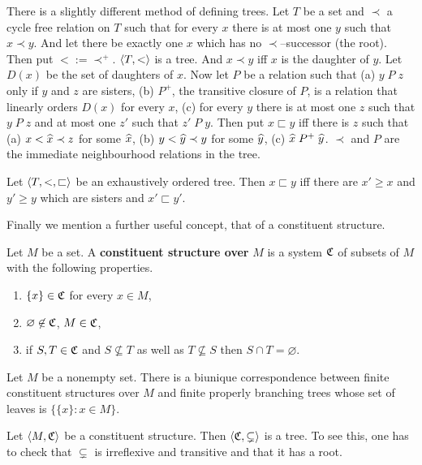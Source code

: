 There is a slightly different method of defining trees.
Let $T$ be a set and $\prec$ a cycle free relation on $T$
such that for every $x$ there is at most one $y $ such that
$x \prec y$. And let there be exactly one $x$ which has no
$\prec$--successor (the root). Then put $< := \prec^+$.
$\langle T, <\rangle$ is a tree. And $x \prec y$ iff
$x$ is the daughter of $y$. Let $D(x)$ be the set of daughters
of $x$. Now let $P$ be a relation such that (a) $y\; P\; z$ only 
if $y$ and $z$ are sisters, (b) $P^+$, the transitive closure 
of $P$, is a relation that linearly orders $D(x)$ for every $x$, 
(c) for every $y$ there is at most one $z$ such that $y \; P \; z$ 
and at most one $z'$ such that $z' \; P\; y$.  Then put 
$x \sqsubset y$ iff there is $z$ such that 
(a) $x < \widehat{x} \prec z$ for some $\widehat{x}$, (b)
$y < \widehat{y} \prec y$ for some $\widehat{y}$, (c)
$\widehat{x}\; P^+\; \widehat{y}$. $\prec$ and $P$ are the immediate
neighbourhood relations in the tree.
\begin{prop}
Let $\langle T, <, \sqsubset\rangle$ be an exhaustively ordered tree.
Then $x \sqsubset y$ iff there are $x' \geq x$ and
$y' \geq y$ which are sisters and $x' \sqsubset y'$.
\end{prop}
Finally we mention a further useful concept, that of a constituent
structure.
\begin{defn}
Let $M$ be a set. A \textbf{constituent structure over}
$M$ is a system $\mathfrak{C}$ of subsets of $M$
with the following properties.
\renewcommand{\labelenumi}{\mbox{\rm (cs\arabic{enumi})}}
\begin{enumerate}
\item
$\{x\} \in \mathfrak{C}$ for every $x \in M$,
\item
$\varnothing \not\in \mathfrak{C}$, $M \in \mathfrak{C}$,
\item
if $S, T \in \mathfrak{C}$ and $S \nsubseteq T$ as well as
$T \nsubseteq S$ then $S \cap T = \varnothing$.
\end{enumerate}
\renewcommand{\labelenumi}{\arabic{enumi}.}
\end{defn}
\begin{prop}
Let $M$ be a nonempty set.
There is a biunique correspondence between finite constituent
structures over $M$ and finite properly branching trees whose
set of leaves is $\{\{x\} : x \in M\}$.
\end{prop}
\proofbeg
Let $\langle M, \mathfrak{C}\rangle$ be a constituent structure.
Then $\langle \mathfrak{C}, \subsetneq\rangle$ is a tree. To see this, one has to check
that $\subsetneq$ is irreflexive and transitive and that it has a root.
